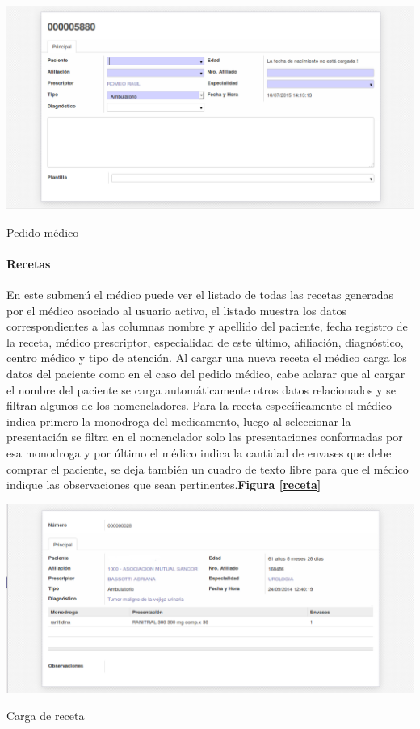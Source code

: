 \begin{correccionFigure}[h]
      \centering
      \includegraphics[width=.8\textwidth]{img/tp1/HE/PedidoMedico}
      \caption{Pedido médico}
      \label{pedido-medico}
\end{correccionFigure}


\paragraph{Recetas}

En este submenú el médico puede ver el listado de todas las recetas generadas por el médico asociado al usuario activo, el listado muestra los datos correspondientes a las columnas nombre y apellido del paciente, fecha registro de la receta, médico prescriptor, especialidad de este último, afiliación, diagnóstico, centro médico y tipo de atención. Al cargar una nueva receta el médico carga los datos del paciente como en el caso del pedido médico, cabe aclarar que al cargar el nombre del paciente se carga automáticamente otros datos relacionados y se filtran algunos de los nomencladores. Para la receta específicamente el médico indica primero la monodroga del medicamento, luego al seleccionar la presentación se filtra en el nomenclador solo las presentaciones conformadas por esa monodroga y por último el médico indica la cantidad de envases que debe comprar el paciente, se deja también un cuadro de texto libre para que el médico indique las observaciones que sean pertinentes.\textbf{Figura \ref{receta}}

\begin{correccionFigure}
      \centering
      \includegraphics[width=.8\textwidth]{img/tp1/HE/Receta}
      \caption{Carga de receta}
      \label{receta}
\end{correccionFigure}


